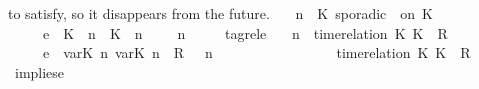 \begin{isabellebody}
{  to satisfy, so it disappears from the future.%
}\isanewline
\ \ {\isacartoucheopen}{\isacharparenleft}{\isasymGamma}{\isacharcomma}\ n\ {\isasymturnstile}\ {\isacharparenleft}{\isacharparenleft}K\ sporadic\ {\isasymtau}\ on\ K\ {\isacharhash}\ {\isasymPsi}{\isacharparenright}\ {\isasymtriangleright}\ {\isasymPhi}{\isacharparenright}\isanewline
\ \ \ \ \ {\isasymhookrightarrow}\isactrlsub e\ \ {\isacharparenleft}{\isacharparenleft}{\isacharparenleft}K\ {\isasymUp}\ n{\isacharparenright}\ {\isacharhash}\ {\isacharparenleft}K\ {\isasymDown}\ n\ {\isacharat}\ {\isasymtau}{\isacharparenright}\ {\isacharhash}\ {\isasymGamma}{\isacharparenright}{\isacharcomma}\ n\ {\isasymturnstile}\ {\isasymPsi}\ {\isasymtriangleright}\ {\isasymPhi}{\isacharparenright}{\isacartoucheclose}\isanewline
{\isacharbar}\ tagrel{\isacharunderscore}e{\isacharcolon}\isanewline
%
\isanewline
\ \ {\isacartoucheopen}{\isacharparenleft}{\isasymGamma}{\isacharcomma}\ n\ {\isasymturnstile}\ {\isacharparenleft}{\isacharparenleft}time{\isacharminus}relation\ {\isasymlfloor}K\ K\ {\isasymin}\ R{\isacharparenright}\ {\isacharhash}\ {\isasymPsi}{\isacharparenright}\ {\isasymtriangleright}\ {\isasymPhi}{\isacharparenright}\isanewline
\ \ \ \ \ {\isasymhookrightarrow}\isactrlsub e\ \ {\isacharparenleft}{\isacharparenleft}{\isacharparenleft}{\isasymlfloor}{\isasymtau}\isactrlsub v\isactrlsub a\isactrlsub r{\isacharparenleft}K\ n{\isacharparenright}{\isacharcomma}\ {\isasymtau}\isactrlsub v\isactrlsub a\isactrlsub r{\isacharparenleft}K\ n{\isacharparenright}{\isasymrfloor}\ {\isasymin}\ R{\isacharparenright}\ {\isacharhash}\ {\isasymGamma}{\isacharparenright}{\isacharcomma}\ n\isanewline
\ \ \ \ \ \ \ \ \ \ \ \ \ \ {\isasymturnstile}\ {\isasymPsi}\ {\isasymtriangleright}\ {\isacharparenleft}{\isacharparenleft}time{\isacharminus}relation\ {\isasymlfloor}K\ K\ {\isasymin}\ R{\isacharparenright}\ {\isacharhash}\ {\isasymPhi}{\isacharparenright}{\isacharparenright}{\isacartoucheclose}\isanewline
{\isacharbar}\ implies{\isacharunderscore}e{}{\isacharcolon}\isanewline
%
\end{isabellebody}
